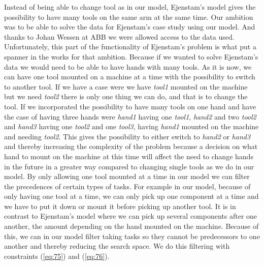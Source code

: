 Instead of being able to change tool as in our model, Ejenstam's model gives the possibility to have many tools on the same arm at the same time. Our ambition was to be able to solve the data for Ejenstam's case study using our model. And thanks to Johan Wessen at ABB we were allowed access to the data used. Unfortunately, this part of the functionality of Ejenstam's problem is what put a spanner in the works for that ambition. Because if we wanted to solve Ejenstam's data we would need to be able to have hands with many tools. As it is now, we can have one tool mounted on a machine at a time with the possibility to switch to another tool. If we have a case were we have \emph{tool1} mounted on the machine but we need \emph{tool2} there is only one thing we can do, and that is to change the tool. If we incorporated the possibility to have many tools on one hand and have the case of having three hands were \emph{hand1} having one \emph{tool1}, \emph{hand2} and two \emph{tool2} and \emph{hand3} having one \emph{tool2} and one \emph{tool3}, having \emph{hand1} mounted on the machine and needing \emph{tool2}. This gives the possibility to either switch to \emph{hand2} or \emph{hand3} and thereby increasing the complexity of the problem because a decision on what hand to mount on the machine at this time will affect the need to change hands in the future in a greater way compared to changing single tools as we do in our model.
\newpage
By only allowing one tool mounted at a time in our model we can filter the precedences of certain types of tasks. For example in our model, because of only having one tool at a time, we can only pick up one component at a time and we have to put it down or mount it before picking up another tool. It is in contrast to Ejenstam's model where we can pick up several components after one another, the amount depending on the hand mounted on the machine. Because of this, we can in our model filter taking tasks so they cannot be predecessors to one another and thereby reducing the search space. We do this filtering with constraints (\ref{eq:75}) and (\ref{eq:76}).

